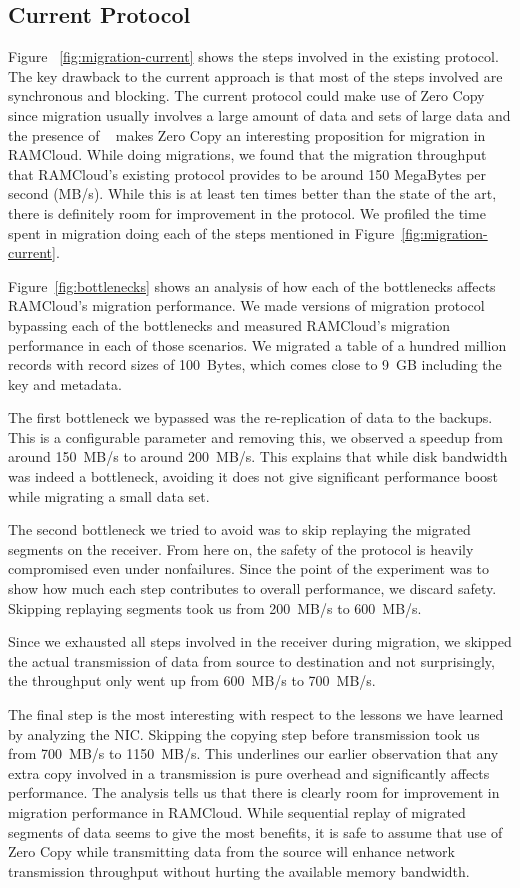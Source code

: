 \subsection{Current Protocol}
Figure ~\ref{fig:migration-current} shows the steps involved in the existing protocol. The key drawback to the current approach is that 
most of the steps involved are synchronous and blocking. The current protocol could make use of Zero Copy since migration usually involves a 
large amount of data and sets of large data and the presence of ~\cite{ramcloudtx} makes Zero Copy an interesting proposition 
for migration in RAMCloud. While doing migrations, we found that the migration throughput that RAMCloud's existing protocol provides to 
be around 150 MegaBytes per second (MB/s). While this is at least ten times better than the state of the art, there is definitely room for improvement in the protocol.
We profiled the time spent in migration doing each of the steps mentioned in Figure~\ref{fig:migration-current}.

Figure~\ref{fig:bottlenecks} shows an analysis of how each of the bottlenecks affects RAMCloud's migration performance. We made versions of migration 
protocol bypassing each of the bottlenecks and measured RAMCloud's migration performance in each of those scenarios. We migrated a table of a hundred million 
records with record sizes of 100~Bytes, which comes close to 9~GB including the key and metadata.

The first bottleneck we bypassed was the re-replication of data to the backups. This is a configurable parameter and removing this, we observed a speedup from around 150~MB/s to around 
200~MB/s. This explains that while disk bandwidth was indeed a bottleneck, avoiding it does not give significant performance boost while migrating a small data set.

The second bottleneck we tried to avoid was to skip replaying the migrated segments on the receiver. From here on, the safety of the protocol is heavily compromised even under 
 nonfailures. Since the point of the experiment was to show how much each step contributes to overall performance, we discard safety. Skipping replaying segments took us from 
 200~MB/s to 600~MB/s. 

Since we exhausted all steps involved in the receiver during migration, we skipped the actual transmission of data from source to destination and not surprisingly, the throughput 
only went up from 600~MB/s to 700~MB/s. 

The final step is the most interesting with respect to the lessons we have learned by analyzing the NIC. Skipping the copying step before transmission took us from 700~MB/s to 
1150~MB/s. This underlines our earlier observation that any extra copy involved in a transmission is pure overhead and significantly affects performance. 
The analysis tells us that there is clearly room for improvement in migration performance in RAMCloud. While sequential replay of migrated segments of data seems to give the most benefits, 
it is safe to assume that use of Zero Copy while transmitting data from the source will enhance network transmission throughput without hurting the available memory bandwidth.

